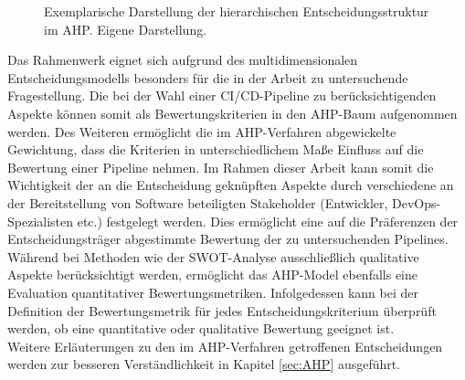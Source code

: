 \begin{center}
	\begin{figure}[H]
		\centering
		\caption[Exemplarische Darstellung der hierarchischen Entscheidungsstruktur im AHP]{Exemplarische Darstellung der hierarchischen Entscheidungsstruktur im AHP. Eigene Darstellung.}
		\label{fig:AHP_B}
	\end{figure}
\end{center}
\vspace*{-10mm}
Das Rahmenwerk eignet sich aufgrund des multidimensionalen Entscheidungsmodells besonders für die in der Arbeit zu untersuchende Fragestellung. Die bei der Wahl einer CI/CD-Pipeline zu berücksichtigenden Aspekte können somit als Bewertungskriterien in den AHP-Baum aufgenommen werden. Des Weiteren ermöglicht die im AHP-Verfahren abgewickelte Gewichtung, dass die Kriterien in unterschiedlichem Maße Einfluss auf die Bewertung einer Pipeline nehmen. Im Rahmen dieser Arbeit kann somit die Wichtigkeit der an die Entscheidung geknüpften Aspekte durch verschiedene an der Bereitstellung von Software beteiligten Stakeholder (Entwickler, DevOps-Spezialisten etc.) festgelegt werden. Dies ermöglicht eine auf die Präferenzen der Entscheidungsträger abgestimmte Bewertung der zu untersuchenden Pipelines. Während bei Methoden wie der SWOT-Analyse ausschließlich qualitative Aspekte berücksichtigt werden, ermöglicht das AHP-Model ebenfalls eine Evaluation quantitativer Bewertungsmetriken. Infolgedessen kann bei der Definition der Bewertungsmetrik für jedes Entscheidungskriterium überprüft werden, ob eine quantitative oder qualitative Bewertung geeignet ist.\\ Weitere Erläuterungen zu den im AHP-Verfahren getroffenen Entscheidungen werden zur besseren Verständlichkeit in Kapitel \ref*{sec:AHP} ausgeführt. 